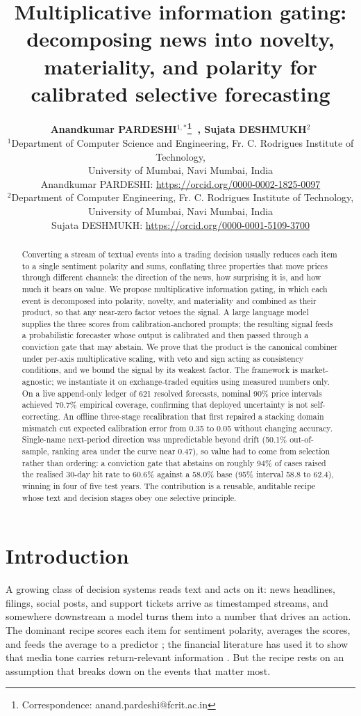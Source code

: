 \documentclass{elektr}
\title{Multiplicative information gating: decomposing news into novelty, materiality, and polarity for calibrated selective forecasting}
\author[PARDESHI and DESHMUKH]{
	\textbf{Anandkumar PARDESHI$^{1,*}$\thanks{Correspondence: anand.pardeshi@fcrit.ac.in}~, Sujata DESHMUKH$^{2}$}\\
	$^{1}$Department of Computer Science and Engineering, Fr. C. Rodrigues Institute of Technology,\\ University of Mumbai, Navi Mumbai, India\\
	Anandkumar PARDESHI: \url{https://orcid.org/0000-0002-1825-0097}\\
	$^{2}$Department of Computer Engineering, Fr. C. Rodrigues Institute of Technology,\\ University of Mumbai, Navi Mumbai, India\\
	Sujata DESHMUKH: \url{https://orcid.org/0000-0001-5109-3700}\\[1.8em]
\rec{.. ... 2026}
\acc{.. ... 2026}
\finv{.. ... 2026}
}
\begin{document}
\maketitle

\begin{abstract}
Converting a stream of textual events into a trading decision usually reduces each item to a single sentiment polarity and sums, conflating three properties that move prices through different channels: the direction of the news, how surprising it is, and how much it bears on value. We propose multiplicative information gating, in which each event is decomposed into polarity, novelty, and materiality and combined as their product, so that any near-zero factor vetoes the signal. A large language model supplies the three scores from calibration-anchored prompts; the resulting signal feeds a probabilistic forecaster whose output is calibrated and then passed through a conviction gate that may abstain. We prove that the product is the canonical combiner under per-axis multiplicative scaling, with veto and sign acting as consistency conditions, and we bound the signal by its weakest factor. The framework is market-agnostic; we instantiate it on exchange-traded equities using measured numbers only. On a live append-only ledger of 621 resolved forecasts, nominal 90\% price intervals achieved 70.7\% empirical coverage, confirming that deployed uncertainty is not self-correcting. An offline three-stage recalibration that first repaired a stacking domain mismatch cut expected calibration error from 0.35 to 0.05 without changing accuracy. Single-name next-period direction was unpredictable beyond drift (50.1\% out-of-sample, ranking area under the curve near 0.47), so value had to come from selection rather than ordering: a conviction gate that abstains on roughly 94\% of cases raised the realised 30-day hit rate to 60.6\% against a 58.0\% base (95\% interval 58.8 to 62.4), winning in four of five test years. The contribution is a reusable, auditable recipe whose text and decision stages obey one selective principle.
\end{abstract}

\section{Introduction}
\label{sec:intro}
A growing class of decision systems reads text and acts on it: news headlines, filings, social posts, and support tickets arrive as timestamped streams, and somewhere downstream a model turns them into a number that drives an action. The dominant recipe scores each item for sentiment polarity, averages the scores, and feeds the average to a predictor \cite{tetlock2007,loughran2011}; the financial literature has used it to show that media tone carries return-relevant information \cite{tetlock2007,antweiler2004}. But the recipe rests on an assumption that breaks down on the events that matter most.
\end{document}
